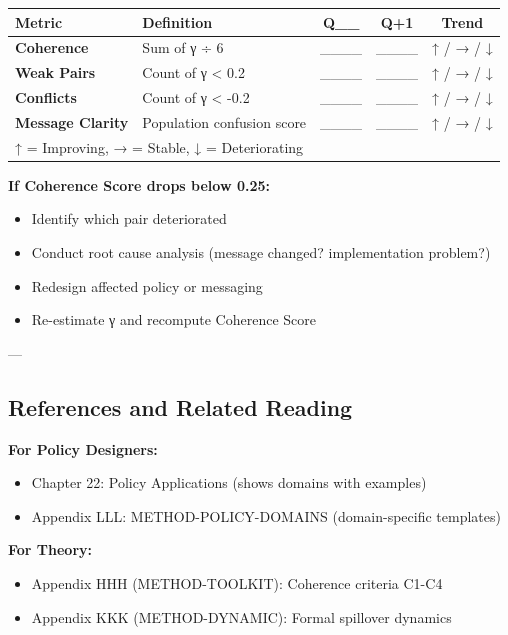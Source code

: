 \begin{center}
\begin{tabular}{@{}llccc@{}}
\toprule
\textbf{Metric} & \textbf{Definition} & \textbf{Q\_\_} & \textbf{Q+1} & \textbf{Trend} \\
\midrule
\textbf{Coherence} & Sum of γ ÷ 6 & \_\_\_\_ & \_\_\_\_ & ↑ / → / ↓ \\
\textbf{Weak Pairs} & Count of γ < 0.2 & \_\_\_\_ & \_\_\_\_ & ↑ / → / ↓ \\
\textbf{Conflicts} & Count of γ < -0.2 & \_\_\_\_ & \_\_\_\_ & ↑ / → / ↓ \\
\textbf{Message Clarity} & Population confusion score & \_\_\_\_ & \_\_\_\_ & ↑ / → / ↓ \\
\multicolumn{5}{l}{\small↑ = Improving, → = Stable, ↓ = Deteriorating} \\
\midrule
\end{tabular}
\end{center}

\textbf{If Coherence Score drops below 0.25:}
\begin{itemize}[nosep]
\item Identify which pair deteriorated
\item Conduct root cause analysis (message changed? implementation problem?)
\item Redesign affected policy or messaging
\item Re-estimate γ and recompute Coherence Score
\end{itemize}

---


\subsection*{References and Related Reading}

\textbf{For Policy Designers:}
\begin{itemize}[nosep]
\item Chapter 22: Policy Applications (shows domains with examples)
\item Appendix LLL: METHOD-POLICY-DOMAINS (domain-specific templates)
\end{itemize}

\textbf{For Theory:}
\begin{itemize}[nosep]
\item Appendix HHH (METHOD-TOOLKIT): Coherence criteria C1-C4
\item Appendix KKK (METHOD-DYNAMIC): Formal spillover dynamics
\end{itemize}

